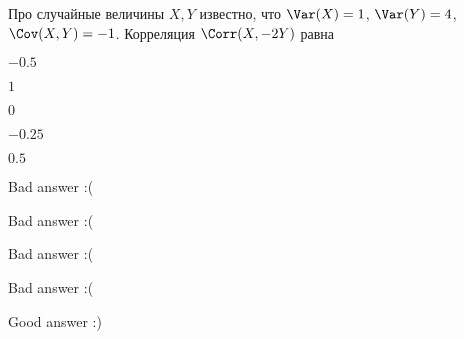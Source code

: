 
\begin{question}
Про случайные величины \(X, Y\) известно, что \(\Var(X)=1\),
\(\Var(Y)=4\), \(\Cov(X,Y)=-1\). Корреляция \(\Corr(X,-2Y)\) равна
\begin{answerlist}
  \item \(-0.5\)
  \item \(1\)
  \item \(0\)
  \item \(-0.25\)
  \item \(0.5\)
\end{answerlist}
\end{question}

\begin{solution}
\begin{answerlist}
  \item Bad answer :(
  \item Bad answer :(
  \item Bad answer :(
  \item Bad answer :(
  \item Good answer :)
\end{answerlist}
\end{solution}

